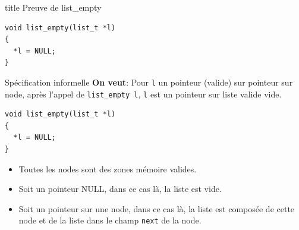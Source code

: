 \documentclass[hyperref={pdfpagelabels=false}]{beamer}
\begin{document}
\begin{frame}[fragile]
  \vfill
  \centering
  \begin{beamercolorbox}[sep=8pt,center,shadow=true,rounded=true]{title}
    Preuve de list\_empty\par%
  \end{beamercolorbox}
  \vfill
  \begin{center}
    \begin{minipage}{0.5\textwidth}
      \begin{verbatim}
void list_empty(list_t *l)
{
  *l = NULL;
}
      \end{verbatim}
    \end{minipage}
  \end{center}
\end{frame}

\begin{frame}[fragile]{Spécification informelle}
  \textbf{On veut}: Pour \texttt{l} un pointeur (valide) sur pointeur sur node, après l'appel de \texttt{list\_empty l}, \texttt{l} est un pointeur sur liste valide vide. \\
  \begin{center}
    \begin{minipage}{0.5\textwidth}
      \begin{verbatim}
void list_empty(list_t *l)
{
  *l = NULL;
}
      \end{verbatim}
    \end{minipage}
  \end{center}
  \vfill
  \begin{itemize}
    \item<3-> Toutes les nodes sont des zones mémoire valides.
    \item<4-> Soit un pointeur NULL, dans ce cas là, la liste est vide.
    \item<4-> Soit un pointeur sur une node, dans ce cas là, la liste est composée de cette node et de la liste dans le champ \texttt{next} de la node.
  \end{itemize}

\end{frame}
\end{document}
